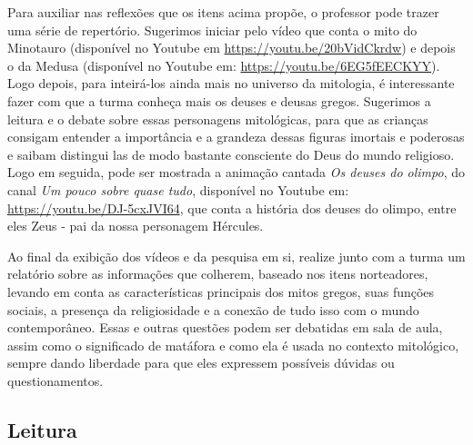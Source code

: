 \documentclass[11pt]{extarticle}
\begin{document}
Para auxiliar nas reflexões que os itens acima propõe, o professor pode trazer uma série de repertório. Sugerimos iniciar pelo vídeo que conta o mito do Minotauro (disponível no Youtube em \url{https://youtu.be/20bVidCkrdw}) e depois o da Medusa (disponível no Youtube em: \url{https://youtu.be/6EG5fEECKYY}). Logo depois, para inteirá-los ainda mais no universo da mitologia, é interessante fazer com que a turma conheça mais os deuses e deusas gregos. Sugerimos a leitura e o debate sobre essas personagens mitológicas, para que as crianças consigam entender a importância e a grandeza dessas figuras imortais e poderosas e saibam distingui las de modo bastante consciente do Deus do mundo religioso. Logo em seguida, pode ser mostrada a animação cantada \textit{Os deuses do olimpo}, do canal \textit{Um pouco sobre quase tudo}, disponível no Youtube em: \url{https://youtu.be/DJ-5cxJVI64}, que conta a história dos deuses do olimpo, entre eles Zeus - pai da nossa personagem Hércules. 


Ao final da exibição dos vídeos e da pesquisa em si, realize junto com a turma um relatório sobre as informações que colherem, baseado nos itens norteadores, levando em conta as características principais dos mitos gregos, suas funções sociais, a presença da religiosidade e a conexão de tudo isso com o mundo contemporâneo. Essas e outras questões podem ser debatidas em sala de aula, assim como o significado de matáfora e como ela é usada no contexto mitológico, sempre dando liberdade para que eles expressem possíveis dúvidas ou questionamentos.


\subsection{Leitura}

\end{document}
